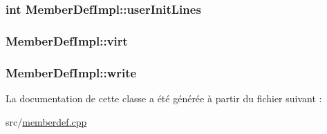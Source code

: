 \subsubsection[{user\+Init\+Lines}]{\setlength{\rightskip}{0pt plus 5cm}int Member\+Def\+Impl\+::user\+Init\+Lines}\label{class_member_def_impl_a42ce43bf816a71053f083e1ca3a43320}
\hypertarget{class_member_def_impl_a43c6a96ca37ddd20203b40d7077f5184}{}
\subsubsection[{virt}]{ Member\+Def\+Impl\+::virt}\label{class_member_def_impl_a43c6a96ca37ddd20203b40d7077f5184}
\hypertarget{class_member_def_impl_a4a6f84d3db473f96ca63dd5b375b247d}{}
\subsubsection[{write}]{ Member\+Def\+Impl\+::write}\label{class_member_def_impl_a4a6f84d3db473f96ca63dd5b375b247d}


La documentation de cette classe a été générée à partir du fichier suivant \+:\begin{DoxyCompactItemize}
\item 
src/\hyperlink{memberdef_8cpp}{memberdef.\+cpp}\end{DoxyCompactItemize}

